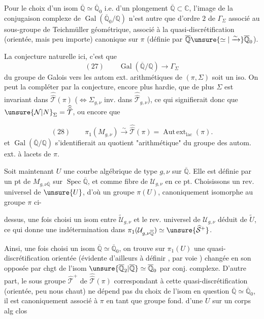 Pour le choix d'un isom $\overline{\mathbb Q}\simeq\overline{\mathbb Q}_0$ i.e. d'un plongement $\overline{\mathbb Q}\subset\mathbb C$, l'image de la conjugaison complexe de $\operatorname{Gal}(\overline{\mathbb Q}_0/\mathbb Q)$ n'est autre que  d'ordre $2$ de $\Gamma_\Sigma$ associé au sous-groupe de Teichmüller géométrique, associé à la quasi-discrétification (orientée, mais peu importe) canonique sur $\pi$ (définie par $\overline{\mathbb Q}\unsure{\simeq|\xrightarrow{\sim}}\overline{\mathbb Q}_0$).

La conjecture naturelle ici, c'est que
\[
(27)\qquad \operatorname{Gal}(\overline{\mathbb Q}/\mathbb Q)\longrightarrow\Gamma_\Sigma
\]
du groupe de Galois vers les autom ext. arithmétiques de $(\pi,\Sigma)$ soit un iso. On peut la compléter par la conjecture, encore plus hardie, que de plus $\Sigma$ est invariant dans $\widehat{\widehat{\mathcal T}}(\pi)$ ($\Longleftrightarrow\Sigma_{g,\nu}$ inv. dans $\widehat{\widehat{\mathcal T}}_{g,\nu}$), ce qui signifierait donc que $\unsure{\mathcal N|N}_\Sigma=\widehat{\widehat{\mathcal T}}$, ou encore que 

\[
(28)\qquad \pi_1(M_{g,\nu})\xrightarrow{\sim}\widehat{\widehat{\mathcal T}}(\pi)
=\operatorname{Aut\,ext}_{\mathrm{lac}}(\pi).
\]
et $\operatorname{Gal}(\overline{\mathbb Q}/\mathbb Q)$ s'identifierait au quotient "arithmétique" du groupe des autom. ext. à lacets de $\pi$.

Soit maintenant $U$ une courbe algébrique de type $g,\nu$ sur $\overline{\mathbb Q}$. Elle est définie par un pt de $M_{g,\nu\overline{\mathbb Q}}$ sur $\operatorname{Spec}\overline{\mathbb Q}$, et  comme fibre de $\mathcal U_{g,\nu}$ en ce pt. Choisissons un rev. universel de $\unsure{U}$, d'où un groupe $\pi(U)$, canoniquement isomorphe au groupe $\pi$ ci-

dessus, une fois choisi un isom entre $\widetilde{\mathcal U}_{g,\nu}$ et le rev. universel de $\mathcal U_{g,\nu}$ déduit de $\widetilde U$, ce qui donne une indétermination dans $\pi_1(\mathcal U_{g,\nu\overline{\mathbb Q}})\simeq\unsure{\widehat{\mathcal S}^{+}}$.

Ainsi, une fois choisi un isom $\overline{\mathbb Q}\simeq\overline{\mathbb Q}_0$, on trouve sur $\pi_1(U)$ une quasi-discrétification orientée (évidente d'ailleurs à définir , par voie ) changée en son opposée par chgt de l'isom $\unsure{\overline{\mathbb Q}_2|\overline{\mathbb Q}}\simeq\overline{\mathbb Q}_0$ par conj. complexe. D'autre part, le sous groupe $\widehat{\mathcal T}^{+}$ de $\widehat{\widehat{\mathcal T}}(\pi)$ correspondant à cette quasi-discrétification (orientée, peu nous chaut) ne dépend pas du choix de l'isom en question $\overline{\mathbb Q}\simeq\overline{\mathbb Q}_0$, il est canoniquement associé à $\pi$ en tant que groupe fond. d'une $U$ sur  un corps alg clos

